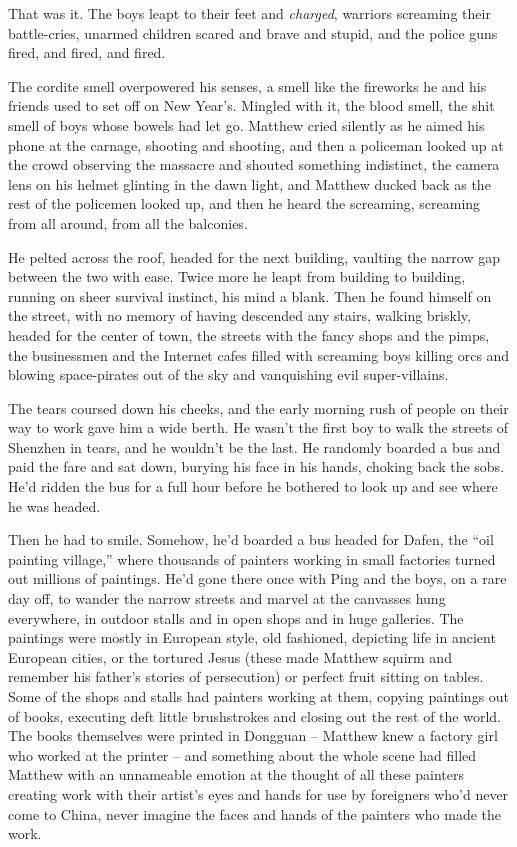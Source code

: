 That was it. The boys leapt to their feet and \emph{charged},
warriors screaming their battle-cries, unarmed children scared and
brave and stupid, and the police guns fired, and fired, and fired.

The cordite smell overpowered his senses, a smell like the
fireworks he and his friends used to set off on New Year's. Mingled
with it, the blood smell, the shit smell of boys whose bowels had
let go. Matthew cried silently as he aimed his phone at the
carnage, shooting and shooting, and then a policeman looked up at
the crowd observing the massacre and shouted something indistinct,
the camera lens on his helmet glinting in the dawn light, and
Matthew ducked back as the rest of the policemen looked up, and
then he heard the screaming, screaming from all around, from all
the balconies.

He pelted across the roof, headed for the next building, vaulting
the narrow gap between the two with ease. Twice more he leapt from
building to building, running on sheer survival instinct, his mind
a blank. Then he found himself on the street, with no memory of
having descended any stairs, walking briskly, headed for the center
of town, the streets with the fancy shops and the pimps, the
businessmen and the Internet cafes filled with screaming boys
killing orcs and blowing space-pirates out of the sky and
vanquishing evil super-villains.

The tears coursed down his cheeks, and the early morning rush of
people on their way to work gave him a wide berth. He wasn't the
first boy to walk the streets of Shenzhen in tears, and he wouldn't
be the last. He randomly boarded a bus and paid the fare and sat
down, burying his face in his hands, choking back the sobs. He'd
ridden the bus for a full hour before he bothered to look up and
see where he was headed.

Then he had to smile. Somehow, he'd boarded a bus headed for Dafen,
the ``oil painting village,'' where thousands of painters working in
small factories turned out millions of paintings. He'd gone there
once with Ping and the boys, on a rare day off, to wander the
narrow streets and marvel at the canvasses hung everywhere, in
outdoor stalls and in open shops and in huge galleries. The
paintings were mostly in European style, old fashioned, depicting
life in ancient European cities, or the tortured Jesus (these made
Matthew squirm and remember his father's stories of persecution) or
perfect fruit sitting on tables. Some of the shops and stalls had
painters working at them, copying paintings out of books, executing
deft little brushstrokes and closing out the rest of the world. The
books themselves were printed in Dongguan -- Matthew knew a factory
girl who worked at the printer -- and something about the whole
scene had filled Matthew with an unnameable emotion at the thought
of all these painters creating work with their artist's eyes and
hands for use by foreigners who'd never come to China, never
imagine the faces and hands of the painters who made the work.

